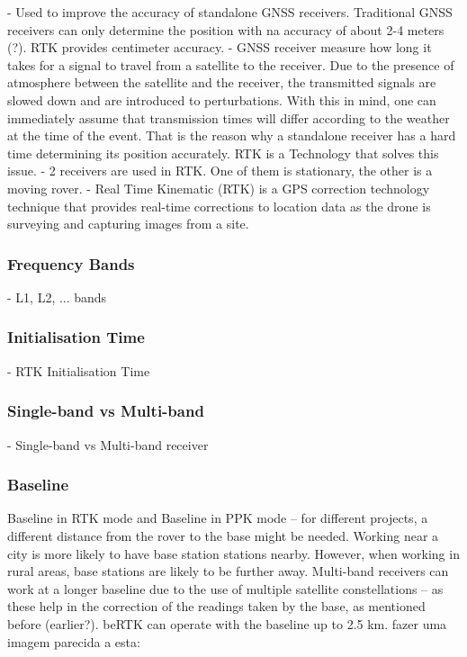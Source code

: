 - Used to improve the accuracy of standalone GNSS receivers. Traditional GNSS receivers can only determine the position with na accuracy of about 2-4 meters (?). RTK provides centimeter accuracy.
- GNSS receiver measure how long it takes for a signal to travel from a satellite to the receiver. Due to the presence of atmosphere between the satellite and the receiver, the transmitted signals are slowed down and are introduced to perturbations. With this in mind, one can immediately assume that transmission times will differ according to the weather at the time of the event. That is the reason why a standalone receiver has a hard time determining its position accurately. RTK is a Technology that solves this issue.
- 2 receivers are used in RTK. One of them is stationary, the other is a moving rover.
- Real Time Kinematic (RTK) is a GPS correction technology technique that provides real-time corrections to location data as the drone is surveying and capturing images from a site.    


\subsubsection{Frequency Bands}\label{sec:II_gnssAug_rtk_freqbands}
- L1, L2, ... bands

\subsubsection{Initialisation Time}\label{sec:II_gnssAug_rtk_inittime}
- RTK Initialisation Time

\subsubsection{Single-band vs Multi-band}\label{sec:II_gnssAug_rtk_smband}
- Single-band vs Multi-band receiver

\subsubsection{Baseline}\label{sec:II_gnssAug_rtk_baseline}
Baseline in RTK mode and Baseline in PPK mode -- for different projects, a different distance from the rover to the base might be needed. Working near a city is more likely to have base station stations nearby. However, when working in rural areas, base stations are likely to be further away.
Multi-band receivers can work at a longer baseline due to the use of multiple satellite constellations -- as these help in the correction of the readings taken by the base, as mentioned before (earlier?). beRTK can operate with the baseline up to 2.5 km.
fazer uma imagem parecida a esta:

